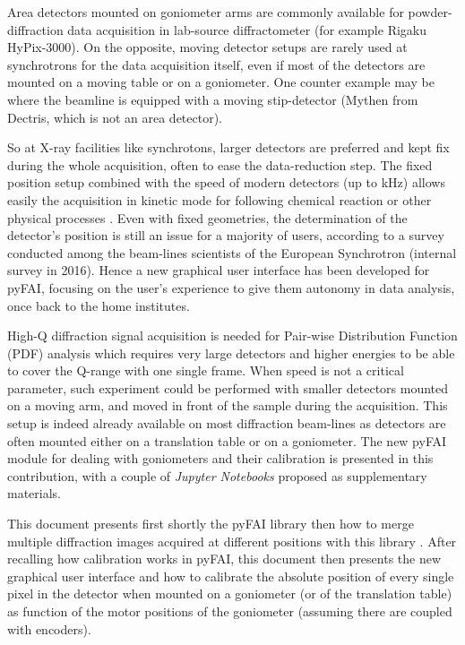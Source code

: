 \documentclass[preprint, pdf]{iucr}              %
\begin{document}
Area detectors mounted on goniometer arms are commonly available for
powder-diffraction data acquisition in lab-source diffractometer (for example
Rigaku HyPix-3000).
On the opposite, moving detector setups are rarely used at synchrotrons for
the data acquisition itself, even if most of the detectors are mounted on a
moving table or on a goniometer. 
One counter example may be \cite{Gao:kc5032} where the beamline is equipped with
a moving stip-detector (Mythen from Dectris, which is not an area detector).

So at X-ray facilities like synchrotons, larger detectors are 
preferred and kept fix during the whole acquisition, often to ease the
data-reduction step.
The fixed position setup combined with the speed of modern detectors (up
to kHz) allows easily the acquisition in kinetic mode for following chemical
reaction or other physical processes \cite{id15, id31}.
Even with fixed geometries, the determination of the detector's position is
still an issue for a majority of users, according to a survey conducted among 
the beam-lines scientists of the European Synchrotron (internal survey in 2016). 
Hence a new graphical user interface has been developed for pyFAI, focusing
on the user's experience to give them autonomy in data analysis, once back to the
home institutes.

High-Q diffraction signal acquisition is needed \cite{Chupas:wf5000} for
Pair-wise Distribution Function (PDF) analysis which requires very large
detectors and higher energies to be able to cover the Q-range with one single frame.
When speed is not a critical parameter, such experiment could be performed
with smaller detectors mounted on a moving arm, and moved in front of
the sample during the acquisition. 
This setup is indeed already available on most diffraction beam-lines as
detectors are often mounted either on a translation table or on a
goniometer. 
The new pyFAI module for dealing with goniometers and their calibration is
presented in this contribution, with a couple of \textit{Jupyter Notebooks}
\cite{ipython} proposed as supplementary materials.

This document presents first shortly the pyFAI library \cite{fv5028} then how to
merge multiple diffraction images acquired at different positions with this
library \cite{PyFAI_PDJ}. 
After recalling how calibration works in pyFAI, this document then 
presents the new graphical user interface and how to
calibrate the absolute position of every single pixel in the detector when
mounted on a goniometer (or of the translation table) as function of the  motor
positions of the goniometer (assuming there are coupled with encoders). 
\end{document}
